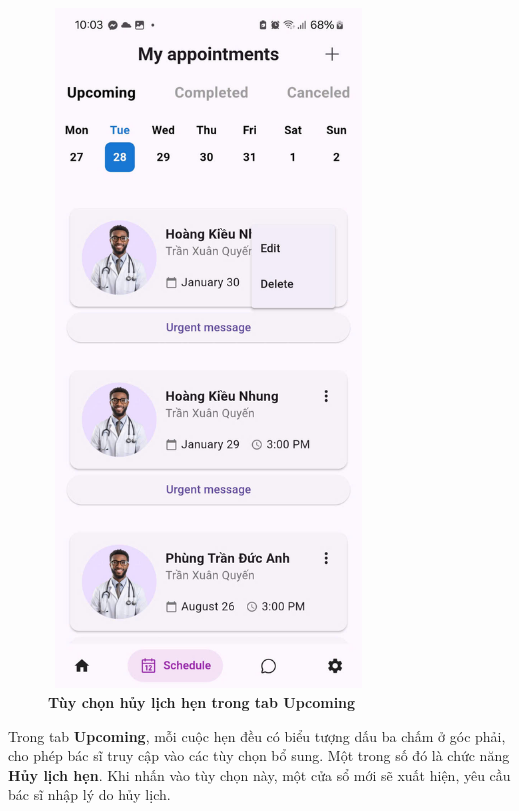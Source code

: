 \begin{figure}[H]
	\centering
	\includegraphics[width=8.5cm,height=18cm]{Images/AppUI/optionSchedule.jpg}
	\caption[Tùy chọn hủy lịch hẹn trong tab Upcoming]{\bfseries \fontsize{12pt}{0pt}\selectfont Tùy chọn hủy lịch hẹn trong tab Upcoming}
	\label{upcomingOptions}
\end{figure}
Trong tab \textbf{Upcoming}, mỗi cuộc hẹn đều có biểu tượng dấu ba chấm ở góc phải, cho phép bác sĩ truy cập vào các tùy chọn bổ sung. Một trong số đó là chức năng \textbf{Hủy lịch hẹn}. Khi nhấn vào tùy chọn này, một cửa sổ mới sẽ xuất hiện, yêu cầu bác sĩ nhập lý do hủy lịch.

